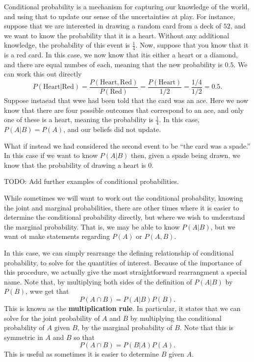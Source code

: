 \documentclass[
  letterpaper,
  DIV=11,
  numbers=noendperiod]{scrreprt}
\begin{document}
Conditional probability is a mechanism for capturing our knowledge of
the world, and using that to update our sense of the uncertainties at
play. For instance, suppose that we are interested in drawing a random
card from a deck of \(52\), and we want to know the probability that it
is a heart. Without any additional knowledge, the probability of this
event is \(\frac{1}{4}\). Now, suppose that you know that it is a red
card. In this case, we now know that itis either a heart or a diamond,
and there are equal numbes of each, meaning that the new probability is
\(0.5\). We can work this out directly
\[P(\text{Heart}|\text{Red}) = \frac{P(\text{Heart},\text{Red})}{P(\text{Red})} = \frac{P(\text{Heart})}{1/2} = \frac{1/4}{1/2} = 0.5.\]
Suppose instaead that wwe had been told that the card was an ace. Here
we now know that there are four possible outcomes that correspond to an
ace, and only one of these is a heart, meaning the probability is
\(\frac{1}{4}\). In this case, \(P(A|B) = P(A)\), and our beliefs did
not update.

What if instead we had considered the second event to be ``the card was
a spade.'' In this case if we want to know \(P(A|B)\) then, given a
spade being drawn, we know that the probability of drawing a heart is
\(0\).

TODO: Add further examples of conditional probabilities.

While sometimes we will want to work out the conditional probability,
knowing the joint and marginal probabilities, there are other times
where it is easier to determine the conditional probability directly,
but where we wish to understand the marginal probability. That is, we
may be able to know \(P(A|B)\), but we want ot make statements regarding
\(P(A)\) or \(P(A,B)\).

In this case, we can simply rearrange the defining relationship of
conditional probability, to solve for the quantities of interest.
Because of the importance of this procedure, we actually give the most
straightforward rearrangment a special name. Note that, by multiplying
both sides of the definition of \(P(A|B)\) by \(P(B)\), wwe get that
\[P(A\cap B) = P(A|B)P(B).\] This is known as the \textbf{multiplication
rule}. In particular, it states that we can solve for the joint
probability of \(A\) and \(B\) by multiplying the conditional
probability of \(A\) given \(B\), by the marginal probability of \(B\).
Note that this is symmetric in \(A\) and \(B\) so that
\[P(A\cap B) = P(B|A)P(A).\] This is useful as sometimes it is easier to
determine \(B\) given \(A\).
\end{document}
